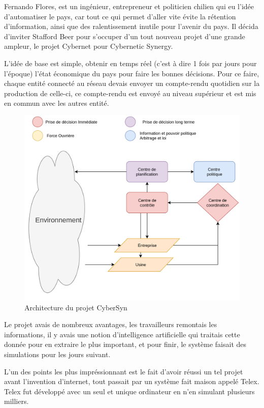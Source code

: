 Fernando Flores, est un ingénieur, entrepreneur et politicien chilien qui eu l'idée
d'automatiser le pays, car tout ce qui permet d'aller vite évite la rétention d'information,
ainsi que des ralentissement inutile pour l'avenir du pays.
Il décida d'inviter Stafford Beer pour s'occuper d'un tout nouveau projet d'une grande ampleur,
le projet Cybernet pour Cybernetic Synergy.

L'idée de base est simple, obtenir en temps réel (c'est à dire 1 fois par jours pour l'époque)
l'état économique du pays pour faire les bonnes décisions.
Pour ce faire, chaque entité connecté au réseau devais envoyer un compte-rendu quotidien sur
la production de celle-ci, ce compte-rendu est envoyé au niveau supérieur et est mis en commun
avec les autres entité.

\begin{figure}[h!]
  \centering
  \includegraphics[scale=0.20]{media/cybersyn.png}
  \caption{Architecture du projet CyberSyn}
\end{figure}

Le projet avais de nombreux avantages, les travailleurs remontais les informations,
il y avais une notion d'intelligence artificielle qui traitais cette donnée pour en extraire
le plus important, et pour finir, le système faisait des simulations pour les jours suivant.

L'un des points les plus impréssionnant est le fait d'avoir réussi un tel projet avant
l'invention d'internet, tout passait par un système fait maison appelé Telex.
Telex fut développé avec un seul et unique ordinateur en n'en simulant plusieurs milliers.

